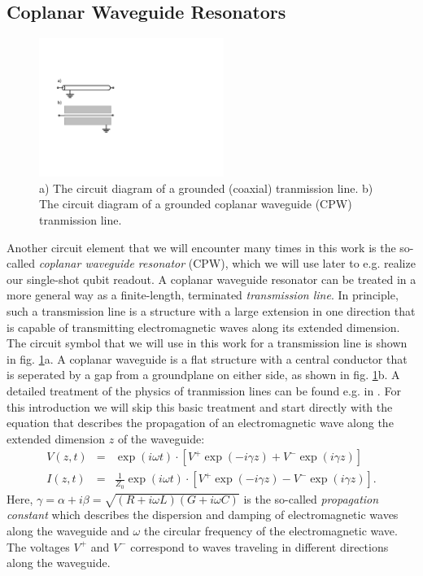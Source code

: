 \subsection{Coplanar Waveguide Resonators}

\begin{figure}
	\includegraphics[width=6cm]{"./material/figures/introduction/transmission_lines"}
	\caption{a) The circuit diagram of a grounded (coaxial) tranmission line. b) The circuit diagram of a grounded coplanar waveguide (CPW) tranmission line.}
	\label{fig:tline_schematic}
\end{figure}

Another circuit element that we will encounter many times in this work is the so-called {\it coplanar waveguide resonator} (CPW), which we will use later to e.g. realize our single-shot qubit readout. A coplanar waveguide resonator can be treated in a more general way as a finite-length, terminated {\it transmission line}. In principle, such a transmission line is a structure with a large extension in one direction that is capable of transmitting electromagnetic waves along its extended dimension. The circuit symbol that we will use in this work for a transmission line is shown in fig. \ref{fig:tline_schematic}a. A coplanar waveguide is a flat structure with a central conductor that is seperated by a gap from a groundplane on either side, as shown in fig. \ref{fig:tline_schematic}b. A detailed treatment of the physics of tranmission lines can be found e.g. in \cite{pozar_microwave_2011}. For this introduction we will skip this basic treatment and start directly with the equation that describes the propagation of an electromagnetic wave along the extended dimension $z$ of the waveguide:
%
\begin{eqnarray}
V(z,t) & = & \exp{\left(i\omega t\right)}\cdot\left[V^+ \exp{\left(-i\gamma z\right)}+V^-\exp{\left(i\gamma z\right)}\right] \\
I(z,t) & = & \frac{1}{Z_0}\exp{\left(i\omega t\right)}\cdot\left[V^+ \exp{\left(-i\gamma z\right)}-V^-\exp{\left(i\gamma z\right)}\right].
\end{eqnarray}
%
Here, $\gamma = \alpha+i\beta = \sqrt{(R+i\omega L)(G+i\omega C)}$ is the so-called {\it propagation constant} which describes the dispersion and damping of electromagnetic waves along the waveguide and $\omega$ the circular frequency of the electromagnetic wave. The voltages $V^+$ and $V^-$ correspond to waves traveling in different directions along the waveguide.

